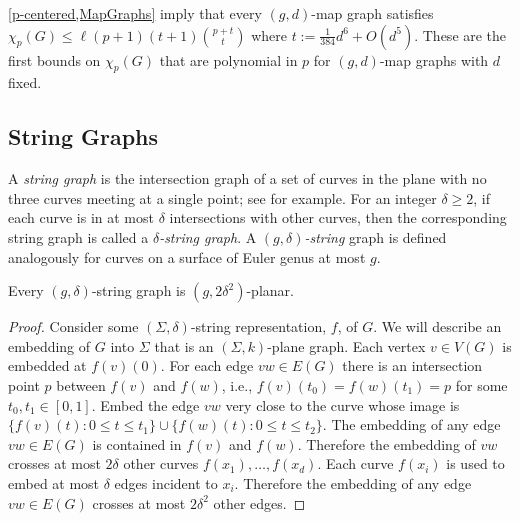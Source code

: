 \documentclass{patmorin}
\renewcommand{\le}{\leqslant}
\renewcommand{\geq}{\geqslant}
\begin{document}
\cref{p-centered,MapGraphs} imply that every $(g,d)$-map graph 
satisfies $\chi_p(G)\le \ell (p+1)(t+1)\binom{p+t}{t}$ where $t:=  \tfrac{1}{384} d^6 + O(d^5)$. These are the first bounds on $\chi_p(G)$ that are polynomial in $p$ for $(g,d)$-map graphs with $d$ fixed. 


\subsection{String Graphs}

A \emph{string graph} is the intersection graph of a set of curves in the plane with no three curves meeting at a single point; see  \cite{PachToth-DCG02,FP10,FP14} for example. For an integer $\delta\geq 2$, if each curve is in at most $\delta$ intersections with other curves, then the corresponding string graph is called a \emph{$\delta$-string graph}. A \emph{$(g,\delta)$-string} graph is defined analogously for curves on a surface of Euler genus at most $g$.  


\begin{lem}
\label{StringGraph}
Every $(g,\delta)$-string graph is $(g,2\delta^2)$-planar. 
\end{lem}

\begin{proof}
Consider some $(\Sigma,\delta)$-string representation, $f$, of $G$.  We will describe an embedding of $G$ into $\Sigma$ that is an $(\Sigma,k)$-plane graph.  Each vertex $v\in V(G)$ is embedded at $f(v)(0)$. For each edge $vw\in E(G)$ there is an intersection point $p$ between $f(v)$ and $f(w)$, i.e., $f(v)(t_0)=f(w)(t_1)=p$ for some $t_0,t_1\in[0,1]$.  Embed the edge $vw$ very close to the curve whose image is $\{f(v)(t): 0\le t\le t_1\}\cup \{ f(w)(t): 0 \le t\le t_2\}$. The embedding of any edge $vw\in E(G)$ is contained in $f(v)$ and $f(w)$.  Therefore the embedding of $vw$ crosses at most $2\delta$ other curves $f(x_1),\ldots,f(x_d)$.  Each curve $f(x_i)$ is used to embed at most $\delta$ edges incident to $x_i$.  Therefore the embedding of any edge $vw\in E(G)$ crosses at most $2\delta^2$ other edges.  
\end{proof}
\end{document}
